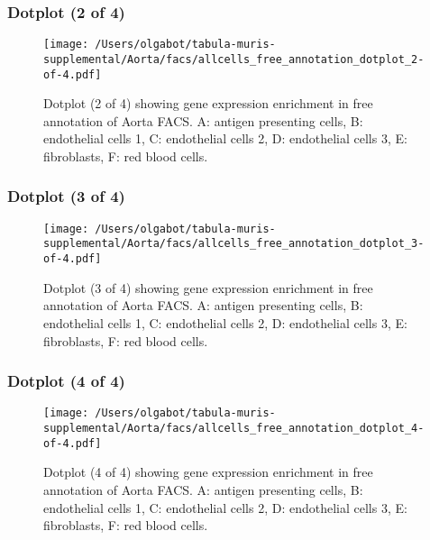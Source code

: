 \clearpage
\clearpage
\subsubsection{Dotplot (2 of 4)}
\begin{figure}[h]
\centering
\texttt{[image: /Users/olgabot/tabula-muris-supplemental/Aorta/facs/allcells\_free\_annotation\_dotplot\_2-of-4.pdf]}

\caption{ Dotplot (2 of 4)  showing gene expression enrichment in free annotation of Aorta FACS. A: antigen presenting cells, B: endothelial cells 1, C: endothelial cells 2, D: endothelial cells 3, E: fibroblasts, F: red blood cells.}
\end{figure}


\clearpage
\clearpage
\subsubsection{Dotplot (3 of 4)}
\begin{figure}[h]
\centering
\texttt{[image: /Users/olgabot/tabula-muris-supplemental/Aorta/facs/allcells\_free\_annotation\_dotplot\_3-of-4.pdf]}

\caption{ Dotplot (3 of 4)  showing gene expression enrichment in free annotation of Aorta FACS. A: antigen presenting cells, B: endothelial cells 1, C: endothelial cells 2, D: endothelial cells 3, E: fibroblasts, F: red blood cells.}
\end{figure}


\clearpage
\clearpage
\subsubsection{Dotplot (4 of 4)}
\begin{figure}[h]
\centering
\texttt{[image: /Users/olgabot/tabula-muris-supplemental/Aorta/facs/allcells\_free\_annotation\_dotplot\_4-of-4.pdf]}

\caption{ Dotplot (4 of 4)  showing gene expression enrichment in free annotation of Aorta FACS. A: antigen presenting cells, B: endothelial cells 1, C: endothelial cells 2, D: endothelial cells 3, E: fibroblasts, F: red blood cells.}
\end{figure}

